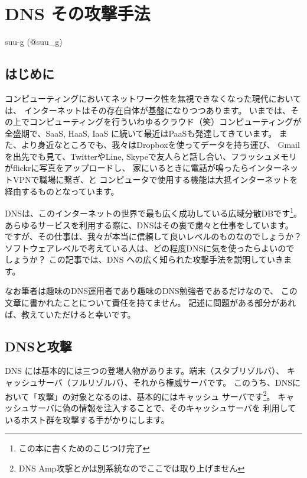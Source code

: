 
\chapter{DNS その攻撃手法}

\begin{flushright}
 {\headfont suu-g (@suu\_g)}
\end{flushright}

\section{はじめに}

コンピューティングにおいてネットワーク性を無視できなくなった現代においては、
インターネットはその存在自体が基盤になりつつあります。
いまでは、その上でコンピューティングを行ういわゆるクラウド（笑）コンピューティングが
全盛期で、SaaS, HaaS, IaaS に続いて最近はPaaSも発達してきています。
また、より身近なところでも、我々はDropboxを使ってデータを持ち運び、
Gmailを出先でも見て、TwitterやLine, Skypeで友人らと話し合い、フラッシュメモリがflickrに写真をアップロードし、
家にいるときに電話が鳴ったらインターネットVPNで職場に繋ぎ、と
コンピュータで使用する機能は大抵インターネットを経由するものとなっています。

DNSは、このインターネットの世界で最も広く成功している広域分散DBです\footnote{この本に書くためのこじつけ完了}。
あらゆるサービスを利用する際に、DNSはその裏で粛々と仕事をしています。
ですが、その仕事は、我々が本当に信頼して良いレベルのものなのでしょうか？
ソフトウェアレベルで考えている人は、どの程度DNSに気を使ったらよいのでしょうか？
この記事では、DNS への広く知られた攻撃手法を説明していきます。

なお筆者は趣味のDNS運用者であり趣味のDNS勉強者であるだけなので、
この文章に書かれたことについて責任を持てません。
記述に問題がある部分があれば、教えていただけると幸いです。

\section{DNSと攻撃}

DNS には基本的には三つの登場人物があります。端末（スタブリゾルバ）、
キャッシュサーバ（フルリゾルバ）、それから権威サーバです。
このうち、DNSにおいて「攻撃」の対象となるのは、基本的にはキャッシュ
サーバです\footnote{DNS Amp攻撃とかは別系統なのでここでは取り上げません}。
キャッシュサーバに偽の情報を注入することで、そのキャッシュサーバを
利用しているホスト群を攻撃する手がかりにします。

